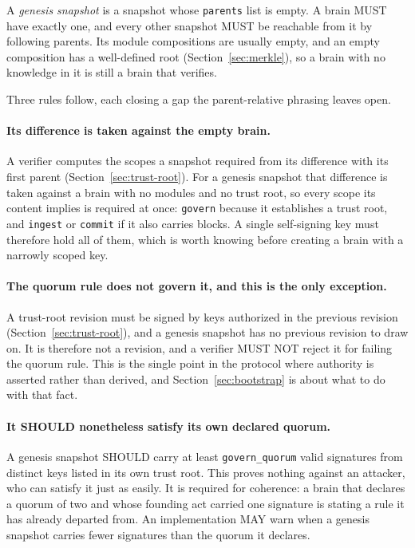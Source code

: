\documentclass[11pt,a4paper]{article}
\begin{document}
A \emph{genesis snapshot} is a snapshot whose \texttt{parents} list is empty.
A brain MUST have exactly one, and every other snapshot MUST be reachable from
it by following parents. Its module compositions are usually empty, and an empty
composition has a well-defined root (Section~\ref{sec:merkle}), so a brain with
no knowledge in it is still a brain that verifies.

Three rules follow, each closing a gap the parent-relative phrasing leaves
open.

\paragraph{Its difference is taken against the empty brain.}
A verifier computes the scopes a snapshot required from its difference with its
first parent (Section~\ref{sec:trust-root}). For a genesis snapshot that
difference is taken against a brain with no modules and no trust root, so every
scope its content implies is required at once: \texttt{govern} because it
establishes a trust root, and \texttt{ingest} or \texttt{commit} if it also
carries blocks. A single self-signing key must therefore hold all of them, which
is worth knowing before creating a brain with a narrowly scoped key.

\paragraph{The quorum rule does not govern it, and this is the only exception.}
A trust-root revision must be signed by keys authorized in the previous revision
(Section~\ref{sec:trust-root}), and a genesis snapshot has no previous revision
to draw on. It is therefore not a revision, and a verifier MUST NOT reject it for
failing the quorum rule. This is the single point in the protocol where authority is asserted rather
than derived, and Section~\ref{sec:bootstrap} is about what to do with that
fact.

\paragraph{It SHOULD nonetheless satisfy its own declared quorum.}
A genesis snapshot SHOULD carry at least \texttt{govern\_quorum} valid
signatures from distinct keys listed in its own trust root. This proves nothing against an attacker, who can satisfy it just as easily. It
is required for coherence: a brain that declares a quorum of two and whose
founding act carried one signature is stating a rule it has already departed
from. An implementation MAY warn when a genesis snapshot
carries fewer signatures than the quorum it declares.
\end{document}
